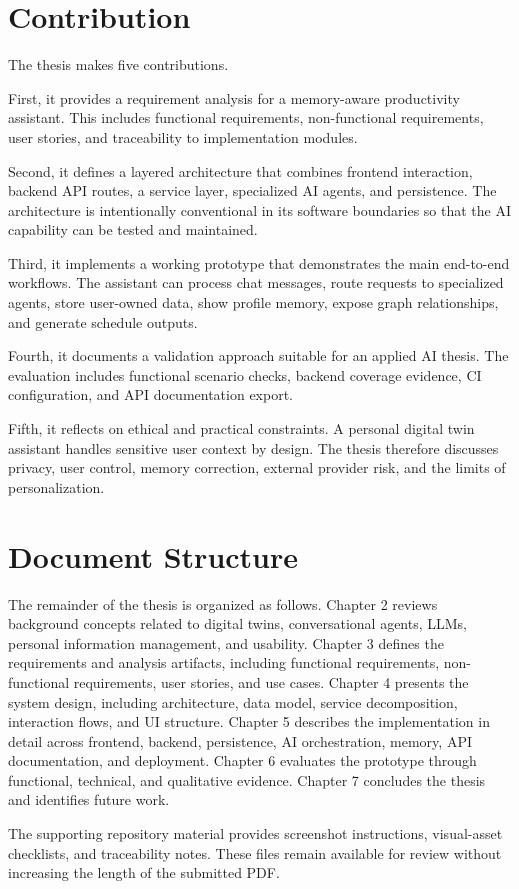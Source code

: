 \section{Contribution}

The thesis makes five contributions.

First, it provides a requirement analysis for a memory-aware productivity assistant. This includes functional requirements, non-functional requirements, user stories, and traceability to implementation modules.

Second, it defines a layered architecture that combines frontend interaction, backend API routes, a service layer, specialized AI agents, and persistence. The architecture is intentionally conventional in its software boundaries so that the AI capability can be tested and maintained.

Third, it implements a working prototype that demonstrates the main end-to-end workflows. The assistant can process chat messages, route requests to specialized agents, store user-owned data, show profile memory, expose graph relationships, and generate schedule outputs.

Fourth, it documents a validation approach suitable for an applied AI thesis. The evaluation includes functional scenario checks, backend coverage evidence, CI configuration, and API documentation export.

Fifth, it reflects on ethical and practical constraints. A personal digital twin assistant handles sensitive user context by design. The thesis therefore discusses privacy, user control, memory correction, external provider risk, and the limits of personalization.

\section{Document Structure}

The remainder of the thesis is organized as follows. Chapter 2 reviews background concepts related to digital twins, conversational agents, LLMs, personal information management, and usability. Chapter 3 defines the requirements and analysis artifacts, including functional requirements, non-functional requirements, user stories, and use cases. Chapter 4 presents the system design, including architecture, data model, service decomposition, interaction flows, and UI structure. Chapter 5 describes the implementation in detail across frontend, backend, persistence, AI orchestration, memory, API documentation, and deployment. Chapter 6 evaluates the prototype through functional, technical, and qualitative evidence. Chapter 7 concludes the thesis and identifies future work.

The supporting repository material provides screenshot instructions, visual-asset checklists, and traceability notes. These files remain available for review without increasing the length of the submitted PDF.

